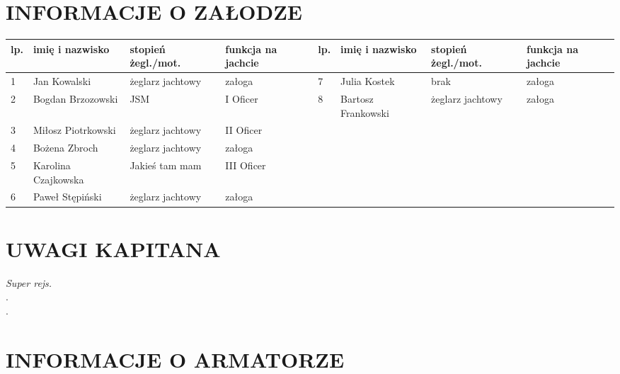 \documentclass{article}
\begin{document}
\section*{INFORMACJE O ZAŁODZE}
    \begin{tabular}{|m{}|m{}|m{}|m{}||m{}|m{}|m{}|m{}|}
    \hline
    lp. & imię i nazwisko & stopień żegl./mot. & funkcja na jachcie & lp. & imię i nazwisko &stopień żegl./mot. & funkcja na jachcie\\
    \hline
    
1 & Jan Kowalski & żeglarz jachtowy & załoga &7 & Julia Kostek & brak & załoga\\
\hline
2 & Bogdan Brzozowski & JSM & I Oficer &8 & Bartosz Frankowski & żeglarz jachtowy & załoga\\
\hline
3 & Miłosz Piotrkowski & żeglarz jachtowy & II Oficer &&&&\\
\hline
4 & Bożena Zbroch & żeglarz jachtowy & załoga &&&&\\
\hline
5 & Karolina Czajkowska & Jakieś tam mam & III Oficer &&&&\\
\hline
6 & Paweł Stępiński & żeglarz jachtowy & załoga &&&&\\
\hline

    \end{tabular}
    
    
\section*{UWAGI KAPITANA}


\textit{Super rejs.}\dotfill \\
.\dotfill \\
.\dotfill \\
\section*{INFORMACJE O ARMATORZE}
\end{document}
